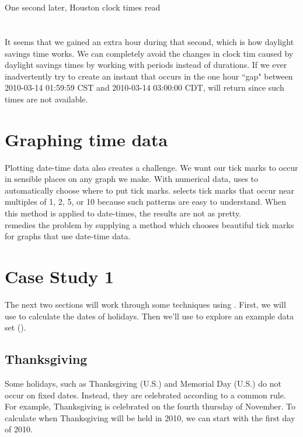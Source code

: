 \documentclass[article]{jss}
\begin{document}
\\
\\

One second later, Houston clock times read\\

\\
\\

It seems that we gained an extra hour during that second, which is how daylight savings time works. We can completely avoid the changes in clock tim caused by daylight savings times by working with periods instead of durations. If we ever inadvertently try to create an instant that occurs in the one hour ``gap" between 2010-03-14 01:59:59 CST  and 2010-03-14 03:00:00 CDT,  will return  since such times are not available.

\section{Graphing time data}
\label{sec:pretty}

Plotting date-time data also creates a challenge. We want our tick marks to occur in sensible places on any graph we make. With numerical data,  uses  to automatically choose where to put tick marks.  selects tick marks that occur near multiples of 1, 2, 5, or 10 because such patterns are easy to understand. When this method is applied to date-times, the results are not as pretty.\\

 remedies the problem by supplying a  method which chooses beautiful tick marks for graphs that use date-time data. 

\section{Case Study 1}

The next two sections will work through some techniques using . First, we will use  to calculate the dates of  holidays. Then we'll use  to explore an example data set ().

\subsection{Thanksgiving}
Some holidays, such as Thanksgiving (U.S.) and Memorial Day (U.S.) do not occur on fixed dates. Instead, they are celebrated according to a common rule. For example, Thanksgiving is celebrated on the fourth thursday of November. To calculate when Thanksgiving will be held in 2010, we can start with the first day of 2010.\\
\end{document}
